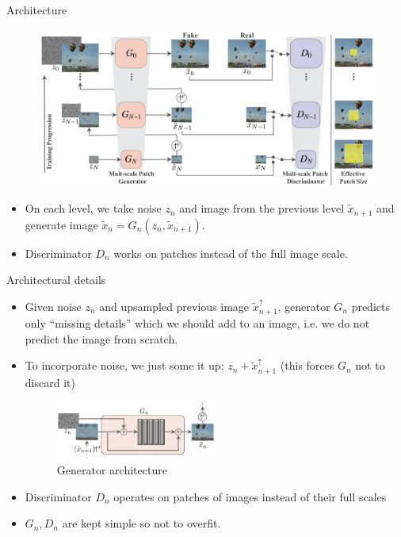 \documentclass[handout, 10pt]{beamer}
\begin{document}
\begin{frame}{Architecture}
    \pause
    \begin{figure}
        \centering
        \includegraphics[width=\textwidth]{images/singan-architecture.png}
    \end{figure}
    
    \begin{itemize}
        \item\pause On each level, we take noise $z_n$ and image from the previous level $\tilde x_{n+1}$ and generate image $\tilde x_n = G_n(z_n, \tilde x_{n+1})$.
        \item\pause Discriminator $D_n$ works on patches instead of the full image scale.
    \end{itemize}
\end{frame}

\begin{frame}{Architectural details}
    \begin{itemize}
        \item\pause Given noise $z_n$ and upsampled previous image $\tilde x_{n+1}^\uparrow$, generator $G_n$ predicts only ``missing details'' which we should add to an image, i.e. we do not predict the image from scratch.
        \item\pause To incorporate noise, we just some it up: $z_n + \tilde x_{n+1}^\uparrow$ (this forces $G_n$ not to discard it)
        \begin{figure}
            \centering
            \includegraphics[width=0.5\textwidth]{images/singan-generator.png}
            \caption{Generator architecture}
        \end{figure}
        \item\pause Discriminator $D_n$ operates on patches of images instead of their full scales
        \item\pause $G_n, D_n$ are kept simple so not to overfit.
    \end{itemize}
\end{frame}
\end{document}
